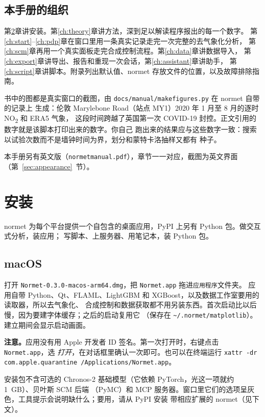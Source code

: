 \documentclass[11pt]{ctexrep}
\newcommand{\nm}{\textsf{normet}}
\newcommand{\codeunderscore}{\textunderscore\allowbreak}
\newcommand{\code}[1]{\texttt{\let\_\codeunderscore #1}}
\newcommand{\NOtwo}{NO\textsubscript{2}}
\newcommand{\note}[1]{\par\noindent\colorbox{codebg}{\parbox{0.97\linewidth}{\small\textbf{注意。}#1}}\par}
\begin{document}
\section{本手册的组织}
第\ref{ch:install}章讲安装。第\ref{ch:theory}章讲方法，深到足以解读程序报出的每一个数字。
第\ref{ch:start}--\ref{ch:pdp}章在窗口里用一条真实记录走完一次完整的去气象化分析，
第\ref{ch:scm}章再用一个真实面板走完合成控制流程。第\ref{ch:data}章讲数据导入，
第\ref{ch:export}章讲导出、报告和重现一次会话，第\ref{ch:assistant}章讲助手，
第\ref{ch:script}章讲脚本。附录列出默认值、\nm{} 存放文件的位置，以及故障排除指南。

书中的图都是真实窗口的截图，由 \code{docs/manual/make\_figures.py} 在 \nm{} 自带的记录上
生成：伦敦 Marylebone Road（站点 MY1）2020 年 1 月至 8 月的逐时 \NOtwo{} 和 ERA5 气象，
这段时间跨越了英国第一次 COVID-19 封控。正文引用的数字就是该脚本打印出来的数字。你自己
跑出来的结果应与这些数字一致：搜索以试验次数而不是墙钟时间为界，划分和蒙特卡洛抽样又都有
种子。

本手册另有英文版（\code{normet\_manual.pdf}），章节一一对应，截图为英文界面
（第~\ref{sec:appearance}~节）。

\chapter{安装}\label{ch:install}

\nm{} 为每个平台提供一个自包含的桌面应用，PyPI 上另有 Python 包。做交互式分析，装应用；
写脚本、上服务器、用笔记本，装 Python 包。

\section{macOS}
打开 \code{Normet-0.3.0-macos-arm64.dmg}，把 \code{Normet.app} 拖进\code{应用程序}文件夹。
应用自带 Python、Qt、FLAML、LightGBM 和 XGBoost，以及数据工作室要用的读取器，所以去气象化、
合成控制和数据获取都不用另装东西。首次启动比以后慢，因为要建字体缓存；之后的启动复用它
（保存在 \code{\textasciitilde/.normet/matplotlib}）。建立期间会显示启动画面。

\note{应用没有用 Apple 开发者 ID 签名。第一次打开时，右键点击 \code{Normet.app}，选
\emph{打开}，在对话框里确认一次即可。也可以在终端运行
\code{xattr -dr com.apple.quarantine /Applications/Normet.app}。}

安装包不含可选的 Chronos-2 基础模型（它依赖 PyTorch，光这一项就约 1~GB）、贝叶斯 SCM 后端
（PyMC）和 MCP 服务器。窗口里它们的选项呈灰色，工具提示会说明缺什么；要用，请从 PyPI 安装
带相应扩展的 \nm{}（见下文）。
\end{document}
